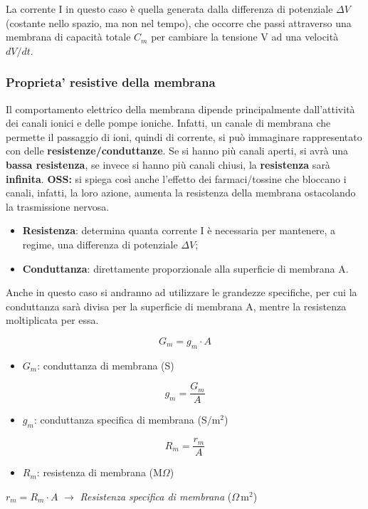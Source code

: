 \documentclass[12pt,a4paper,openany]{book}
\begin{document}
La corrente I in questo caso è quella generata dalla differenza di potenziale $\Delta V$ (costante nello spazio, ma non nel tempo), che occorre che passi attraverso una membrana di capacità totale $C_m$ per cambiare la tensione V ad una velocità $dV/dt$.

\subsubsection{Proprieta' resistive della membrana}

Il comportamento elettrico della membrana dipende principalmente dall'attività dei canali ionici e delle pompe ioniche. Infatti, un canale di membrana che permette il passaggio di ioni, quindi di corrente, si può immaginare rappresentato con delle \textbf{resistenze/conduttanze}.
Se si hanno più canali aperti, si avrà una \textbf{bassa resistenza}, se invece si hanno più canali chiusi, la \textbf{resistenza }sarà \textbf{infinita}.
\textbf{OSS: }si spiega così anche l'effetto dei farmaci/tossine che bloccano i canali, infatti, la loro azione, aumenta la resistenza della membrana ostacolando la trasmissione nervosa.

\begin{itemize}
  \item \textbf{Resistenza}: determina quanta corrente I è necessaria per mantenere, a regime, una differenza di potenziale $\Delta V$;
  \item \textbf{Conduttanza}: direttamente proporzionale alla superficie di membrana A.
\end{itemize}
Anche in questo caso si andranno ad utilizzare le grandezze specifiche, per cui la conduttanza sarà divisa per la superficie di membrana A, mentre la resistenza moltiplicata per essa.

\[
  G_m = g_m \cdot A
\]
\begin{itemize}
  \item $G_m$: conduttanza di membrana (S)
\end{itemize}
\[
  g_m = \frac{G_m}{A}
\]
\begin{itemize}
  \item $g_m$: conduttanza specifica di membrana ($\mathrm{S/m^2}$)
\end{itemize}
\[
  R_m = \frac{r_m}{A}
\]
\begin{itemize}
  \item $R_m$: resistenza di membrana (M$\Omega$)
\end{itemize}
$r_m = R_m \cdot A$ $\rightarrow$ \textit{Resistenza specifica di membrana} ($\Omega\,\text{m}^2$)
\end{document}
